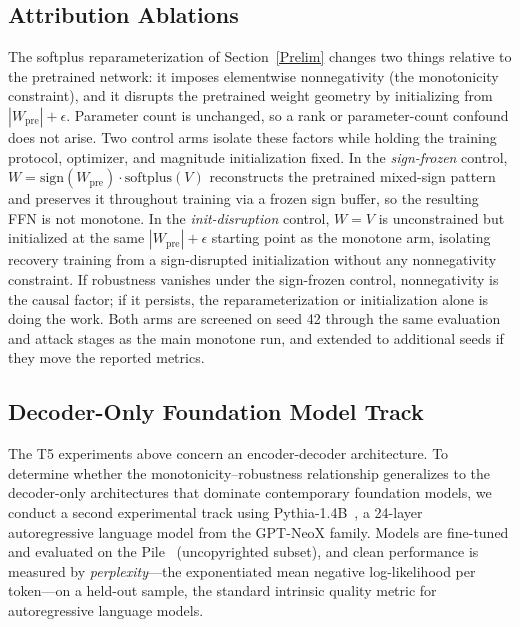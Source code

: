 \documentclass{article}
\theoremstyle{plain}
\theoremstyle{definition}
\theoremstyle{remark}
\begin{document}
\subsection{Attribution Ablations}
\label{sec:ablation-setup}
The softplus reparameterization of Section~\ref{Prelim} changes two things relative to the pretrained network: it imposes elementwise nonnegativity (the monotonicity constraint), and it disrupts the pretrained weight geometry by initializing from $|W_{\mathrm{pre}}|+\epsilon$. Parameter count is unchanged, so a rank or parameter-count confound does not arise. Two control arms isolate these factors while holding the training protocol, optimizer, and magnitude initialization fixed. In the \emph{sign-frozen} control, $W=\mathrm{sign}(W_{\mathrm{pre}})\cdot\mathrm{softplus}(V)$ reconstructs the pretrained mixed-sign pattern and preserves it throughout training via a frozen sign buffer, so the resulting FFN is not monotone. In the \emph{init-disruption} control, $W=V$ is unconstrained but initialized at the same $|W_{\mathrm{pre}}|+\epsilon$ starting point as the monotone arm, isolating recovery training from a sign-disrupted initialization without any nonnegativity constraint. If robustness vanishes under the sign-frozen control, nonnegativity is the causal factor; if it persists, the reparameterization or initialization alone is doing the work. Both arms are screened on seed 42 through the same evaluation and attack stages as the main monotone run, and extended to additional seeds if they move the reported metrics.

\subsection{Decoder-Only Foundation Model Track}
\label{sec:setup-pythia}
The T5 experiments above concern an encoder-decoder architecture. To determine whether the monotonicity--robustness relationship generalizes to the decoder-only architectures that dominate contemporary foundation models, we conduct a second experimental track using Pythia-1.4B~\cite{biderman2023pythia}, a 24-layer autoregressive language model from the GPT-NeoX family. Models are fine-tuned and evaluated on the Pile~\cite{gao2020pile} (uncopyrighted subset), and clean performance is measured by \emph{perplexity}—the exponentiated mean negative log-likelihood per token—on a held-out sample, the standard intrinsic quality metric for autoregressive language models.
\end{document}
